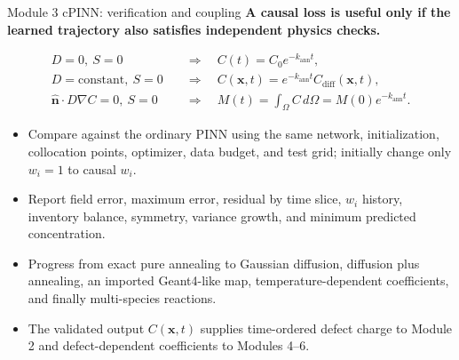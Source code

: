 \documentclass[aspectratio=169,10pt]{beamer}
\begin{document}
\begin{frame}{Module 3 cPINN: verification and coupling}
\small
\textbf{A causal loss is useful only if the learned trajectory also satisfies independent physics checks.}

\vspace{-0.1em}
\begin{align*}
D=0,\ S=0
&\quad\Rightarrow\quad
C(t)=C_0e^{-k_{\mathrm{ann}}t},
\\[-0.1em]
D=\text{constant},\ S=0
&\quad\Rightarrow\quad
C(\mathbf x,t)=e^{-k_{\mathrm{ann}}t}C_{\mathrm{diff}}(\mathbf x,t),
\\[-0.1em]
\hat{\mathbf n}\cdot D\nabla C=0,\ S=0
&\quad\Rightarrow\quad
M(t)=\int_{\Omega}C\,d\Omega=M(0)e^{-k_{\mathrm{ann}}t}.
\end{align*}

\vspace{-0.2em}
\begin{itemize}
    \item Compare against the ordinary PINN using the same network, initialization, collocation points, optimizer, data budget, and test grid; initially change only $w_i=1$ to causal $w_i$.
    \item Report field error, maximum error, residual by time slice, $w_i$ history, inventory balance, symmetry, variance growth, and minimum predicted concentration.
    \item Progress from exact pure annealing to Gaussian diffusion, diffusion plus annealing, an imported Geant4-like map, temperature-dependent coefficients, and finally multi-species reactions.
    \item The validated output $C(\mathbf x,t)$ supplies time-ordered defect charge to Module 2 and defect-dependent coefficients to Modules 4--6.
\end{itemize}
\end{frame}
\end{document}

